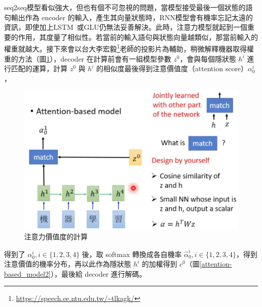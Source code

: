 seq2seq模型看似強大，但也有個不可忽視的問題，當模型接受最後一個狀態的語句輸出作為 encoder 的輸入，產生其向量狀態時，RNN模型會有機率忘記太遠的資訊，即使加上LSTM~\cite{gers1999learning}或GLU仍無法妥善解決。此時，注意力模型就起到一個重要的作用，其度量了相似性。若當前的輸入語句與狀態向量越類似，那當前輸入的權重就越大。接下來會以台大李宏毅\footnote{\url{https://speech.ee.ntu.edu.tw/~tlkagk/}}老師的投影片為輔助，稍微解釋機器取得權重的方法（圖\ref{attention-based_model1}），decoder 在計算前會有一組模型參數 $z^0$，會與每個隱狀態 $h^i$ 進行匹配的運算，計算 $z^0$ 與 $h^i$ 的相似度最後得到注意價值度（attention score）$\alpha_0^i$，
\begin{figure}[htbp]
    \hfil
    \begin{minipage}[t]{0.45\textwidth}
        \includegraphics[width=\textwidth]{./figures/chapter02_method/attention-based_model1.png}
        \caption {注意力價值度的計算}
        \label{attention-based_model1}
    \end{minipage}
    \hfil
\end{figure}
得到了 $\alpha_0^i, i\in\{1,2,3,4\}$ 後，取 softmax 轉換成各自機率 $\hat{\alpha}_0^i, i\in\{1,2,3,4\}$，得到注意價值的機率分布，再以此作為隱狀態 $h^i$ 的加權得到 $c^0$（圖\ref{attention-based_model2}），最後給 decoder 進行解碼。 
